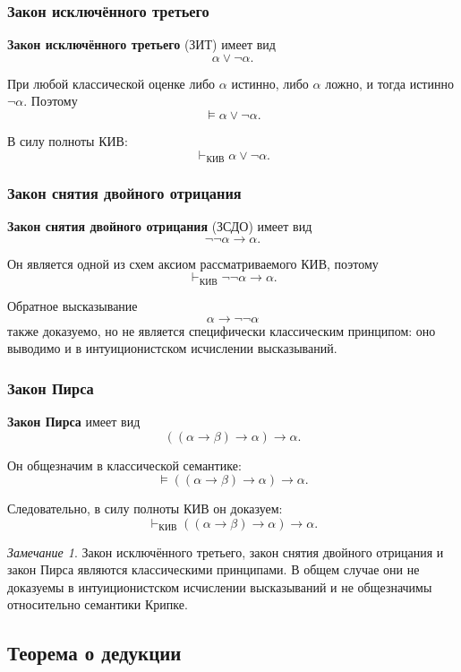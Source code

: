 \documentclass[12pt,a4paper,oneside,openany]{book}
\theoremstyle{definition}
\theoremstyle{plain}
\theoremstyle{remark}
\newtheorem{remark}{Замечание}[chapter]
\begin{document}
\subsubsection{Закон исключённого третьего}

\textbf{Закон исключённого третьего} (ЗИТ) имеет вид
\[
\alpha\lor\neg\alpha.
\]

При любой классической оценке либо \(\alpha\) истинно, либо
\(\alpha\) ложно, и тогда истинно \(\neg\alpha\). Поэтому
\[
\models\alpha\lor\neg\alpha.
\]

В силу полноты КИВ:
\[
\vdash_{\mathrm{КИВ}}\alpha\lor\neg\alpha.
\]

\subsubsection{Закон снятия двойного отрицания}

\textbf{Закон снятия двойного отрицания} (ЗСДО) имеет вид
\[
\neg\neg\alpha\to\alpha.
\]

Он является одной из схем аксиом рассматриваемого КИВ, поэтому
\[
\vdash_{\mathrm{КИВ}}\neg\neg\alpha\to\alpha.
\]

Обратное высказывание
\[
\alpha\to\neg\neg\alpha
\]
также доказуемо, но не является специфически классическим принципом:
оно выводимо и в интуиционистском исчислении высказываний.

\subsubsection{Закон Пирса}

\textbf{Закон Пирса} имеет вид
\[
((\alpha\to\beta)\to\alpha)\to\alpha.
\]

Он общезначим в классической семантике:
\[
\models((\alpha\to\beta)\to\alpha)\to\alpha.
\]

Следовательно, в силу полноты КИВ он доказуем:
\[
\vdash_{\mathrm{КИВ}}
((\alpha\to\beta)\to\alpha)\to\alpha.
\]

\begin{remark}
Закон исключённого третьего, закон снятия двойного отрицания и закон
Пирса являются классическими принципами. В общем случае они не
доказуемы в интуиционистском исчислении высказываний и не общезначимы
относительно семантики Крипке.
\end{remark}


\subsection{Теорема о дедукции}
\end{document}
